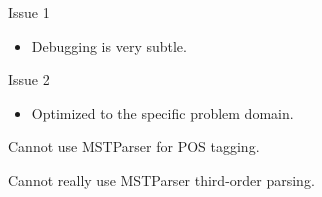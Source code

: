 \documentclass{beamer}
\def\im#1#2{
  \node(#1) [scale=#2]{\pgfbox[center,top]{\pgfuseimage{#1}}
};}
\newcommand{\air}{\vspace{0.5cm}}
\begin{document}

\begin{frame}[t]{Issue 1}
  \begin{itemize}
  \item Debugging is very subtle.
  \end{itemize}


  \begin{figure}
    \centering
  \end{figure}


\end{frame}

\bgroup
{}

\begin{frame}[t]
  \vspace{-1.2cm}
  \begin{figure}
    \centering
  \end{figure}
\end{frame}

\bgroup
{}

\begin{frame}{Issue 2}
  \begin{itemize}
  \item Optimized to the specific problem domain.
  \end{itemize}
  \air 

  Cannot use MSTParser for POS tagging. 
  \pause 
  \air

  Cannot really use MSTParser third-order parsing. 

\end{frame}
\end{document}
